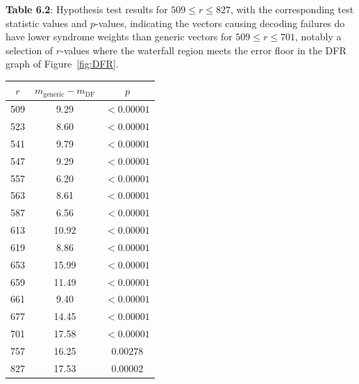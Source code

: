 \begin{flushleft}
\textbf{Table 6.2}: Hypothesis test results for $509 \leq r \leq 827$, with the corresponding test statistic values and $p$-values, indicating the vectors causing decoding failures do have lower syndrome weights than generic vectors for $509 \leq r \leq 701$, notably a selection of $r$-values where the waterfall region meets the error floor in the DFR graph of Figure~\ref{fig:DFR}.
\end{flushleft}
\begin{table}[ht]\label{table:hyp_test_ts_and_ps}
\centering
\begin{tabular}{c|c|c}
$r$   & $m_{\text{generic}} - m_{\text{DF}}$ & $p$                \\
\hline
509 & 9.29                          & $< 0.00001$ \\
523 & 8.60                          & $< 0.00001$ \\
541 & 9.79                          & $< 0.00001$ \\
547 & 9.29                          & $< 0.00001$ \\
557 & 6.20                          & $< 0.00001$ \\
563 & 8.61                          & $< 0.00001$ \\
587 & 6.56                          & $< 0.00001$ \\
613 & 10.92                         & $< 0.00001$ \\
619 & 8.86                          & $< 0.00001$ \\
653 & 15.99                          & $< 0.00001$ \\
659 & 11.49                          & $< 0.00001$ \\
661 & 9.40                          & $< 0.00001$ \\
677 & 14.45                          & $< 0.00001$ \\
701 & 17.58                          & $< 0.00001$ \\
757 & 16.25                          & $ 0.00278$ \\
827 & 17.53                          & $ 0.00002$ \\

\end{tabular}

\end{table}



